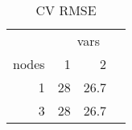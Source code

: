\begin{table}

\caption{\label{tab:}CV RMSE}
\centering
\begin{tabular}[t]{r|r|r}
\hline
\multicolumn{1}{c|}{ } & \multicolumn{3}{c}{vars} \\
\cline{2-4}
nodes & 1 & 2\\
\hline
1 & 28 & 26.7\\
\hline
3 & 28 & 26.7\\
\hline
\end{tabular}
\end{table}